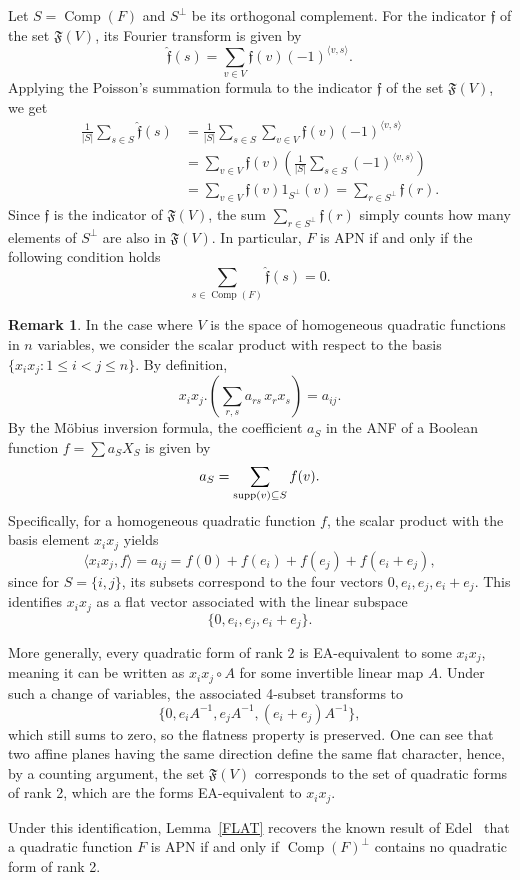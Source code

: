 \documentclass{amsart}[11pt]
\theoremstyle{plain}
\theoremstyle{definition}
\newtheorem{remark}[theorem]{Remark}
\numberwithin{theorem}{section}
\numberwithin{equation}{section}
\numberwithin{table}{section}
\numberwithin{figure}{section}
\numberwithin{algorithm}{section}
\DeclareMathOperator{\comp}{Comp}
\def\flat{{\mathfrak f}}
\def\Flat(#1){{{\mathfrak F}(#1)}}
\def\supp(#1){{\rm supp}(#1)}
\begin{document}
	Let $S= \operatorname{Comp}(F)$ and $S^\perp$ be its orthogonal complement. 
	For the indicator $\flat$ of the set $\Flat(V)$,  its Fourier transform is given by $$\widehat{\flat}(s) = \sum_{v \in V} \flat(v) (-1)^{\langle v, s \rangle }.$$ 
	Applying the Poisson's summation formula to the indicator $\flat$ of the set $\Flat(V)$, we get
	\begin{equation*}
		\begin{split}
			\frac{1}{|S|} \sum_{s \in S} \widehat{\flat}(s) &=\frac{1}{|S|} \sum_{s \in S} \sum_{v \in V} \flat(v) (-1)^{{\langle v, s \rangle }}\\
            &= \sum_{v \in V} \flat(v) \left( \frac{1}{|S|} \sum_{s \in S} (-1)^{{\langle v, s \rangle }} \right)\\
			&=\sum_{v \in V} \flat(v) 1_{S^\perp}(v) = \sum_{r \in S^\perp} \flat(r).
		\end{split}
	\end{equation*}
	Since $\flat$ is the indicator of $\Flat(V)$, the sum $\sum_{r \in S^\perp} \flat(r)$ simply counts how many elements of $S^\perp$ are also in $\Flat(V)$. In particular, 
    $F$ is APN if and only if the following condition holds
    \begin{equation}\label{eq: zero}
	   \sum_{s\in  \operatorname{Comp}(F) 
       } \widehat{\flat}(s) = 0.
    \end{equation}
    

\begin{remark}
	In the case where $V$ is the space of homogeneous quadratic functions in $n$ variables, we 
    consider the scalar product with respect to the basis $\{x_i x_j \colon 1 \leq i < j \leq n\}$. By definition,
	$$ x_ix_j .  \left( \sum_{r, s} a_{rs}\, x_rx_s\right) = a_{ij}.$$ By the M\"obius inversion formula, the coefficient $a_S$ in the ANF of a Boolean function $f = \sum a_S X_S$ is given by $$a_S = \sum_{\supp(v) \subseteq S} f(v).$$ Specifically, for a homogeneous quadratic function $f$, the scalar product with the basis element $x_i x_j$ yields
	\[ \langle x_i x_j, f \rangle = a_{ij}=f(0) + f(e_i) + f(e_j) + f(e_i + e_j), \]
	since for $S=\{i,j\}$, its subsets correspond to the four vectors $0,e_i,e_j,e_i+e_j$. This identifies $x_i x_j$ as a flat vector associated with the linear subspace $$\{0, e_i, e_j, e_i + e_j\}.$$ 
    
    More generally, every quadratic form of rank $2$ is EA-equivalent to some $x_ix_j$, meaning it can be written as $x_ix_j \circ A$ for some invertible linear map $A$. Under such a change of variables, the associated 4-subset transforms to $$\{0, e_iA^{-1}, e_jA^{-1}, (e_i+e_j)A^{-1}\},$$ which still sums to zero, so the flatness property is preserved.
    One can see that
    two affine planes having the same direction define the same flat 
    character, hence, by a counting argument,
    the set $\Flat(V)$ corresponds to the set of quadratic 
    forms of rank 2, which are the forms EA-equivalent to $x_i x_j$. 
    
    Under this identification, Lemma~\ref{FLAT} recovers the known result of Edel~\cite[Lemma 8]{Edel2011} that a quadratic function $F$ is APN if and only if $\comp(F)^\perp$ contains no quadratic form of rank 2.
\end{remark}
\end{document}
